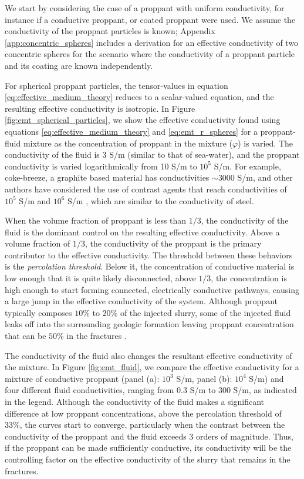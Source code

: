 We start by considering the case of a proppant with uniform conductivity, for instance if a conductive proppant, or coated proppant were used. We assume the conductivity of the proppant particles is known; Appendix \ref{app:concentric_spheres} includes a derivation for an effective conductivity of two concentric spheres for the scenario where the conductivity of a proppant particle and its coating are known independently.

For spherical proppant particles, the tensor-values in equation \ref{eq:effective_medium_theory} reduces to a scalar-valued equation, and the resulting effective conductivity is isotropic. In Figure \ref{fig:emt_spherical_particles}, we show the effective conductivity found using equations \ref{eq:effective_medium_theory} and \ref{eq:emt_r_spheres} for a proppant-fluid mixture as the concentration of proppant in the mixture ($\varphi$) is varied. The conductivity of the fluid is 3 S/m (similar to that of sea-water), and the proppant conductivity is varied logarithmically from 10 S/m to $10^5$ S/m. For example, coke-breeze, a graphite based material has conductivities $\sim 3000$ S/m, and other authors have considered the use of contrast agents that reach conductivities of $10^5$ S/m \cite{Weiss2015} and $10^6$ S/m \cite{Pardo2013}, which are similar to the conductivity of steel.




When the volume fraction of proppant is less than $1/3$, the conductivity of the fluid is the dominant control on the resulting effective conductivity. Above a volume  fraction of $1/3$, the conductivity of the proppant is the primary contributor to the effective conductivity. The threshold between these behaviors is the \emph{percolation threshold}. Below it, the concentration of conductive material is low enough that it is quite likely disconnected, above $1/3$, the concentration is high enough to start forming connected, electrically conductive pathways, causing a large jump in the effective conductivity of the system. Although proppant typically composes $10\%$ to $20\%$ of the injected slurry, some of the injected fluid leaks off into the surrounding geologic formation leaving proppant concentration that can be $50\%$ in the fractures \cite{Novotny1977, Hoversten2015}.

The conductivity of the fluid also changes the resultant effective conductivity of the mixture. In Figure \ref{fig:emt_fluid}, we compare the effective conductivity for a mixture of conductive proppant (panel (a): $10^3$ S/m, panel (b): $10^4$ S/m) and four different fluid conductivities, ranging from 0.3 S/m to 300 S/m, as indicated in the legend. Although the conductivity of the fluid makes a significant difference at low proppant concentrations, above the percolation threshold of 33\%, the curves start to converge, particularly when the contrast between the conductivity of the proppant and the fluid exceeds 3 orders of magnitude. Thus, if the proppant can be made sufficiently conductive, its conductivity will be the controlling factor on the effective conductivity of the slurry that remains in the fractures.



